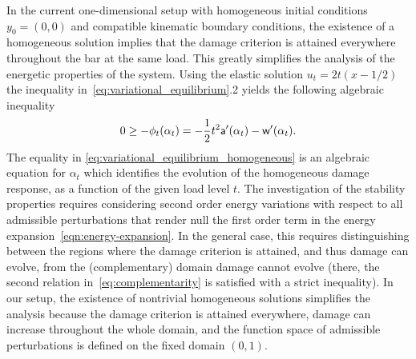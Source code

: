 In the current one-dimensional setup with homogeneous initial conditions $y_0=(0, 0)$ and compatible kinematic boundary conditions, the existence of a homogeneous solution implies that the damage criterion is attained everywhere throughout the bar at the same load. This greatly simplifies the analysis of the energetic properties of the system. 
Using the elastic solution $u_t = 2t(x-1/2)$ 
 the inequality in~\eqref{eq:variational_equilibrium}.2 yields the following algebraic inequality
\begin{equation}
    \label{eq:variational_equilibrium_homogeneous}
    0 \geq -\phi_t(\alpha_t)= -\frac{1}{2}t^2 \mathsf{a}'(\alpha_t)-\mathsf{w}'(\alpha_t).
\end{equation}
The equality in \eqref{eq:variational_equilibrium_homogeneous} is an algebraic equation for $\alpha_t$ which identifies the evolution of the homogeneous damage response, as a function of the given load level $t$.
The investigation of the stability properties requires  
considering second order energy variations with respect to all admissible perturbations that render null the first order term in the energy expansion~\eqref{eqn:energy-expansion}.
In the general case, this requires distinguishing between the regions where the damage criterion is attained, and thus damage can evolve, from the (complementary) domain damage cannot evolve (there, the second relation in~\eqref{eq:complementarity} is satisfied with a strict inequality).
In our setup, the existence of nontrivial homogeneous solutions simplifies the analysis because the damage criterion is attained everywhere, damage can increase throughout the whole domain, and the function space of admissible perturbations is defined on the fixed domain $(0, 1)$.



